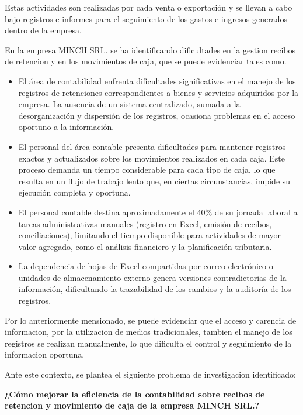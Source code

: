 \documentclass[stu]{apa7}
\begin{document}
Estas actividades son realizadas por cada venta o exportación y se llevan a cabo bajo registros e informes para el seguimiento de los gastos e ingresos generados dentro de la empresa.

En la empresa MINCH SRL. se ha identificando dificultades en la gestion recibos de retencion y en los movimientos de caja, que se puede evidenciar tales como.

\begin{itemize}
    \item El área de contabilidad enfrenta dificultades significativas en el manejo de los registros de retenciones correspondientes a bienes y servicios adquiridos por la empresa. La ausencia de un sistema centralizado, sumada a la desorganización y dispersión de los registros, ocasiona problemas en el acceso oportuno a la información.

    \item El personal del área contable presenta dificultades para mantener registros exactos y actualizados sobre los movimientos realizados en cada caja. Este proceso demanda un tiempo considerable para cada tipo de caja, lo que resulta en un flujo de trabajo lento que, en ciertas circunstancias, impide su ejecución completa y oportuna.

    \item El personal contable destina aproximadamente el 40\% de su jornada laboral a tareas administrativas manuales (registro en Excel, emisión de recibos, conciliaciones), limitando el tiempo disponible para actividades de mayor valor agregado, como el análisis financiero y la planificación tributaria.

    \item La dependencia de hojas de Excel compartidas por correo electrónico o unidades de almacenamiento externo genera versiones contradictorias de la información, dificultando la trazabilidad de los cambios y la auditoría de los registros.
\end{itemize}

Por lo anteriormente mensionado, se puede evidenciar que el acceso y carencia de informacion, por la utilizacion de medios tradicionales, tambien el manejo de los registros se realizan manualmente, lo que dificulta el control y seguimiento de la informacion oportuna.

Ante este contexto, se plantea el siguiente problema de investigacion identificado:

\textbf{¿Cómo mejorar la eficiencia de la contabilidad sobre recibos de retencion y movimiento de caja de la empresa MINCH SRL.?}
\end{document}
